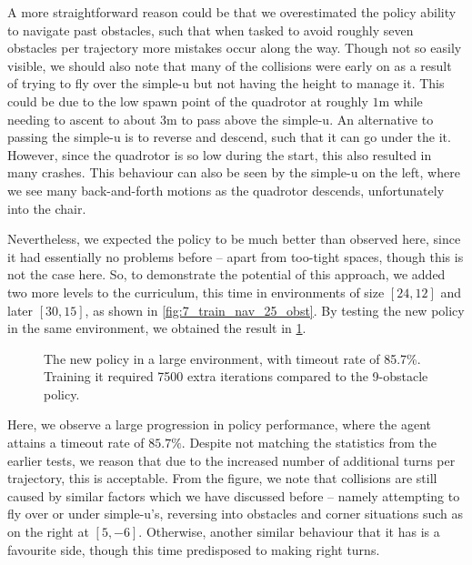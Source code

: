 A more straightforward reason could be that we overestimated the policy ability to navigate past obstacles, such that when tasked to avoid roughly seven obstacles per trajectory more mistakes occur along the way. Though not so easily visible, we should also note that many of the collisions were early on as a result of trying to fly over the simple-u but not having the height to manage it. This could be due to the low spawn point of the quadrotor at roughly $1$m while needing to ascent to about 3m to pass above the simple-u. An alternative to passing the simple-u is to reverse and descend, such that it can go under the it. However, since the quadrotor is so low during the start, this also resulted in many crashes. This behaviour can also be seen by the simple-u on the left, where we see many back-and-forth motions as the quadrotor descends, unfortunately into the chair. 

Nevertheless, we expected the policy to be much better than observed here, since it had essentially no problems before -- apart from too-tight spaces, though this is not the case here. So, to demonstrate the potential of this approach, we added two more levels to the curriculum, this time in environments of size $[24, 12]$ and later $[30, 15]$, as shown in \cref{fig:7_train_nav_25_obst}.
By testing the new policy in the same environment, we obtained the result in \cref{fig:7_large_env_new_policy}.
\begin{figure}[htb]
    \centering
    \label{fig:7_large_env_new_policy}
    \captionsetup{justification=centering}
    \caption{The new policy in a large environment, with timeout rate of 85.7\%. Training it required 7500 extra iterations compared to the 9-obstacle policy.}
\end{figure}

Here, we observe a large progression in policy performance, where the agent attains a timeout rate of $85.7\%$. Despite not matching the statistics from the earlier tests, we reason that due to the increased number of additional turns per trajectory, this is acceptable. From the figure, we note that collisions are still caused by similar factors which we have discussed before -- namely attempting to fly over or under simple-u's, reversing into obstacles and corner situations such as on the right at $[5, -6]$. Otherwise, another similar behaviour that it has is a favourite side, though this time predisposed to making right turns.
